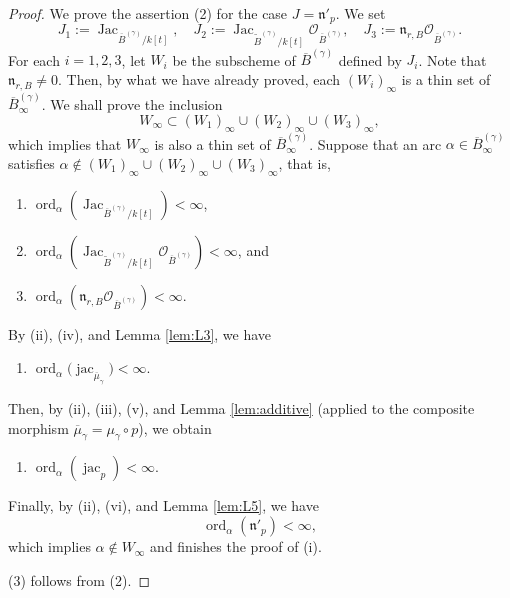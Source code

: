 \documentclass[a4paper,11pt]{amsart}
\theoremstyle{definition}
\theoremstyle{remark}
\begin{document}
\begin{proof}
We prove the assertion (2) for the case $J = \mathfrak{n}'_{p}$. 
We set 
\[
J_1 := \operatorname{Jac}_{\overline{B}^{(\gamma)}/k[t]}, \quad
J_2 := \operatorname{Jac}_{\widetilde{B}^{(\gamma)}/k[t]} \mathcal{O}_{\overline{B}^{(\gamma)}}, \quad
J_3 := \mathfrak{n}_{r,B} \mathcal{O}_{\overline{B}^{(\gamma)}}. 
\]
For each $i = 1,2,3$, let $W_i$ be the subscheme of $\overline{B}^{(\gamma)}$ defined by $J _i$. 
Note that $\mathfrak{n}_{r,B} \neq 0$. 
Then, by what we have already proved, each $(W_i)_{\infty}$ is a thin set of $\overline{B}^{(\gamma)} _{\infty}$. 
We shall prove the inclusion
\[
W_{\infty} \subset (W_1)_{\infty} \cup (W_2)_{\infty} \cup (W_3)_{\infty}, \tag{i}
\]
which implies that $W_{\infty}$ is also a thin set of $\overline{B}^{(\gamma)} _{\infty}$. 
Suppose that an arc $\alpha \in \overline{B}^{(\gamma)} _{\infty}$ satisfies $\alpha \notin (W_1)_{\infty} \cup (W_2)_{\infty} \cup (W_3)_{\infty}$, that is, 
\begin{enumerate}
\item[(ii)] 
$\operatorname{ord}_{\alpha} \left( \operatorname{Jac}_{\overline{B}^{(\gamma)}/k[t]} \right ) < \infty$, 
\item[(iii)]
$\operatorname{ord}_{\alpha} \left( \operatorname{Jac}_{\widetilde{B}^{(\gamma)}/k[t]} \mathcal{O}_{\overline{B}^{(\gamma)}} \right)< \infty$, and 
\item[(iv)]
$\operatorname{ord}_{\alpha} \left( \mathfrak{n}_{r,B} \mathcal{O}_{\overline{B}^{(\gamma)}} \right) < \infty$. 
\end{enumerate}
By (ii), (iv), and Lemma \ref{lem:L3}, we have
\begin{enumerate}
\item[(v)]
$\operatorname{ord}_{\alpha} \bigl( \operatorname{jac}_{\overline{\mu} _{\gamma}} \bigr) < \infty$. 
\end{enumerate}
Then, by (ii), (iii), (v), and Lemma \ref{lem:additive} (applied to the composite morphism $\overline{\mu}_{\gamma} = \mu_{\gamma} \circ p$), 
we obtain
\begin{enumerate}
\item[(vi)]
$\operatorname{ord}_{\alpha} \left( \operatorname{jac}_p \right) < \infty$. 
\end{enumerate}
Finally, by (ii), (vi), and Lemma \ref{lem:L5}, we have 
\[
\operatorname{ord}_{\alpha} (\mathfrak{n}'_{p}) < \infty, 
\]
which implies $\alpha \notin W_{\infty}$ and finishes the proof of (i). 


(3) follows from (2). 
\end{proof}
\end{document}
